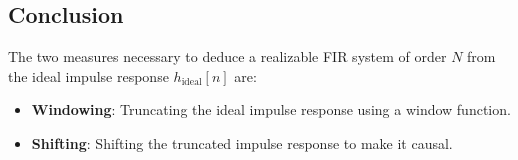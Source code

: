 \subsection*{Conclusion}
The two measures necessary to deduce a realizable FIR system of order \( N \) from the ideal impulse response \( h_{\text{ideal}}[n] \) are:
\begin{itemize}
    \item \textbf{Windowing}: Truncating the ideal impulse response using a window function.
    \item \textbf{Shifting}: Shifting the truncated impulse response to make it causal.
\end{itemize}
